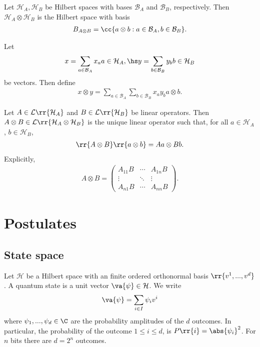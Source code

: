 \documentclass{article}
\begin{document}
\begin{definition}
  \label{def:tensor-product}
  Let $\mathcal H_A, \mathcal H_B$ be Hilbert spaces with bases $\mathcal B_A$ and
  $\mathcal B_B$, respectively. Then $\mathcal H_A\otimes\mathcal H_B$ is the Hilbert
  space with basis
  \begin{align*}
    B_{A\otimes B} = \cc{a \otimes b : a \in \mathcal B_A, b\in\mathcal B_B}.
  \end{align*}

  Let
  \begin{align*}
    x = \sum_{a\in\mathcal B_A} x_a a\in\mathcal H_A, \hs
    y = \sum_{b\in\mathcal B_B} y_b b\in\mathcal H_B
  \end{align*}
  be vectors. Then define
  \begin{align*}
    x \otimes y = \sum_{a\in\mathcal B_A}\sum_{b\in\mathcal B_B} x_a y_b a \otimes b.
  \end{align*}

  Let $A\in\mathcal L\rr{\mathcal H_A}$ and $B\in\mathcal L\rr{\mathcal H_B}$ be linear
  operators. Then $A\otimes B\in\mathcal L\rr{\mathcal H_A\otimes\mathcal H_B}$ is the
  unique linear operator such that, for all $a\in\mathcal H_A$, $b\in\mathcal H_B$,
  \begin{align*}
    \rr{A\otimes B}\rr{a \otimes b} = A a \otimes B b.
  \end{align*}
  Explicitly,
  \begin{align*}
    A \otimes B = \begin{pmatrix}
      A_{11} B & \cdots & A_{1n}B \\
      \vdots   & \ddots & \vdots  \\
      A_{n1} B & \cdots & A_{nn}B
    \end{pmatrix}.
  \end{align*}
\end{definition}

\section{Postulates}
\label{sec:postulates}

\subsection{State space}
\label{sec:quantum-states}

\begin{definition}
  \label{def:quantum-state}
  Let $\mathcal H$ be a Hilbert space with an finite ordered orthonormal basis
  $\rr{v^1, ..., v^d}$. A quantum state is a unit vector $\va{\psi}\in\mathcal H$.
  We write
  \begin{align*}
    \va{\psi} = \sum_{i\in I} \psi_i v^i
  \end{align*}
  where $\psi_1,...,\psi_d\in\C$ are the probability amplitudes of the $d$ outcomes.
  In particular, the probability of the outcome $1\leq i\leq d$, is $P \rr{ i } = \abs{ \psi_i }^2$.
  For $n$ bits there are $d=2^n$ outcomes.
\end{definition}
\end{document}
